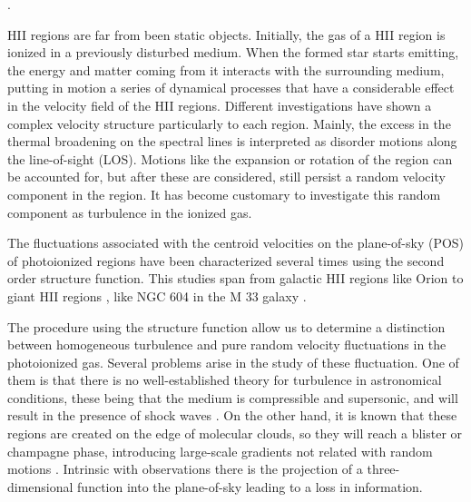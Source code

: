 \documentclass[fleqn,usenatbib, useAMS, a4paper]{mnras}
\begin{document}
.

HII regions are far from been static objects.
Initially, the gas of a HII region is ionized in a previously disturbed medium.
When the formed star starts emitting, the energy and matter coming from it interacts with the surrounding medium, putting in motion a series of dynamical processes that have a considerable effect in the velocity field of the HII regions.
Different investigations have shown a complex velocity structure particularly to each region. 
Mainly, the excess in the thermal broadening on the spectral lines is interpreted as disorder motions along the line-of-sight (LOS).
Motions like the expansion or rotation of the region can be accounted for, but after these are considered, still persist a random velocity component in the region.
It has become customary to investigate this random component as turbulence in the ionized gas.

The fluctuations associated with the centroid velocities on the plane-of-sky (POS) of photoionized regions have been characterized several times using the second order structure function.
This studies span from galactic HII regions \citep{1986ApJ...300..624R} like Orion \citep{von1951methode,munch1958internal,castaneda1988,1992ApJ...387..229O,arthur2016turbulence} to giant HII regions \citep{1961MNRAS.122....1F,lagrois2009multi,lagrois2011}, like NGC 604 in the M 33 galaxy \citep{tanco1997,2019arXiv191203543M}.

The procedure using the structure function allow us to determine a distinction between homogeneous turbulence and pure random velocity fluctuations in the photoionized gas.
Several problems arise in the study of these fluctuation.
One of them is that there is no well-established theory for turbulence in astronomical conditions, these being that the medium is compressible and supersonic, and will result in the presence of shock waves \citep{lagrois2011,arthur2016turbulence}.
On the other hand, it is known that these regions are created on the edge of molecular clouds, so they will reach a blister or champagne phase, introducing large-scale gradients not related with random motions \citep{Mivi1995}.
Intrinsic with observations there is the projection of a three-dimensional function into the plane-of-sky \citep{von1951methode,munch1958internal,1964SvA.....8..210K} leading to a loss in information.
\end{document}
